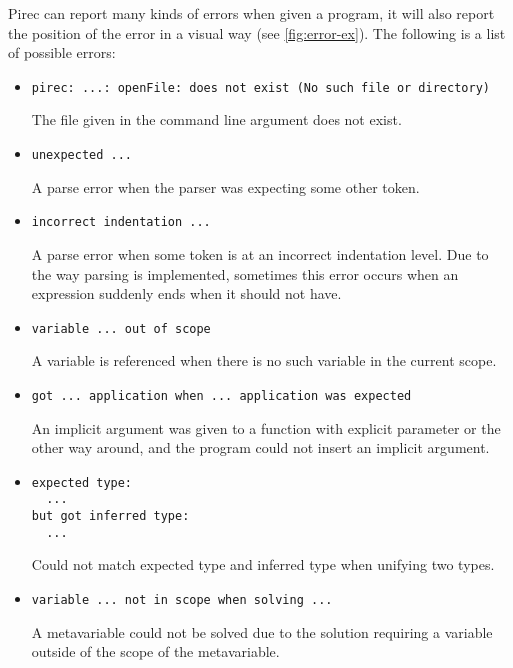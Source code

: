 Pirec can report many kinds of errors when given a program, it will also report
the position of the error in a visual way (see \cref{fig:error-ex}). The
following is a list of possible errors:
\begin{itemize}
  \item \begin{verbatim}
pirec: ...: openFile: does not exist (No such file or directory)
        \end{verbatim}
        The file given in the command line argument does not exist.

  \item \begin{verbatim}
unexpected ...
        \end{verbatim}
        A parse error when the parser was expecting some other token.

  \item \begin{verbatim}
incorrect indentation ...
        \end{verbatim}
        A parse error when some token is at an incorrect indentation level. Due
        to the way parsing is implemented, sometimes this error occurs when an
        expression suddenly ends when it should not have.

  \item \begin{verbatim}
variable ... out of scope
        \end{verbatim}
        A variable is referenced when there is no such variable in the current
        scope.

  \item \begin{verbatim}
got ... application when ... application was expected
        \end{verbatim}
        An implicit argument was given to a function with explicit parameter or
        the other way around, and the program could not insert an implicit
        argument.

  \item \begin{verbatim}
expected type:
  ...
but got inferred type:
  ...
        \end{verbatim}
        Could not match expected type and inferred type when unifying two types.

  \item \begin{verbatim}
variable ... not in scope when solving ...
        \end{verbatim}
        A metavariable could not be solved due to the solution requiring a
        variable outside of the scope of the metavariable.


\end{itemize}
